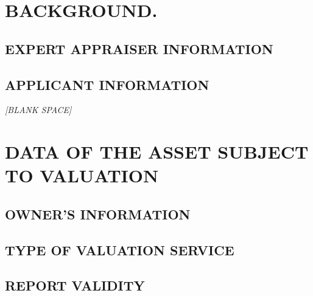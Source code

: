 \documentclass[10pt,letter]{report}
\renewcommand{\espacio}[1]{\vspace{#1}\begin{center}\textit{[BLANK SPACE]}\end{center}\newpage}
\begin{document}
\def\sectionautorefname{section}
\def\subsectionautorefname{section}
\def\subsubsectionautorefname{section}


\thispagestyle{plain}
\NoBgThispage


\newpage
\setcounter{page}{1}
\thispagestyle{fancy}
\tableofcontents

\newpage


\chapter{BACKGROUND.}\label{cap:1}
\thispagestyle{fancy}
\section{EXPERT APPRAISER INFORMATION}\label{sec:a}

\section{APPLICANT INFORMATION}\label{sec:b}


\espacio{3cm}

\chapter{DATA OF THE ASSET SUBJECT TO VALUATION}\label{cap:2}
\thispagestyle{fancy}
\setcounter{section}{2}
\section{OWNER'S INFORMATION}\label{sec:c}

\section{TYPE OF VALUATION SERVICE}\label{sec:d}


\section{REPORT VALIDITY}\label{sec:e}

\end{document}
